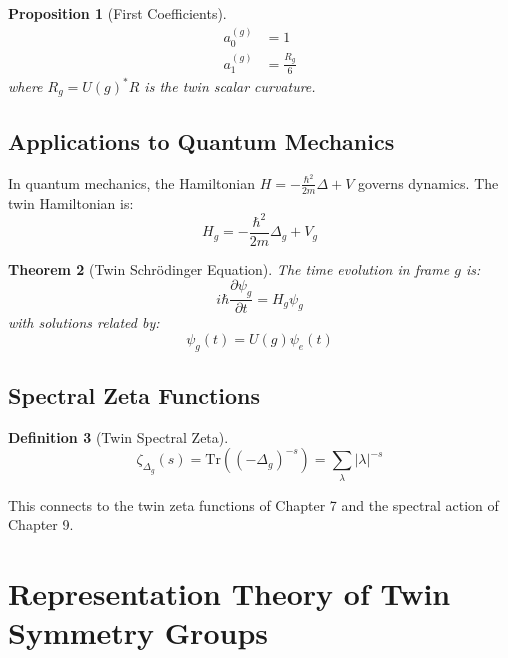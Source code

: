 \documentclass[11pt,a4paper,openright]{book}
\theoremstyle{plain}
\newtheorem{theorem}{Theorem}[chapter]
\newtheorem{proposition}[theorem]{Proposition}
\theoremstyle{definition}
\newtheorem{definition}[theorem]{Definition}
\newcommand{\Tr}{\mathrm{Tr}}
\begin{document}
\begin{proposition}[First Coefficients]
\begin{align}
a_0^{(g)} &= 1 \\
a_1^{(g)} &= \frac{R_g}{6}
\end{align}
where $R_g = U(g)^* R$ is the twin scalar curvature.
\end{proposition}

\section{Applications to Quantum Mechanics}

In quantum mechanics, the Hamiltonian $H = -\frac{\hbar^2}{2m}\Delta + V$ governs dynamics. The twin Hamiltonian is:
\begin{equation}
H_g = -\frac{\hbar^2}{2m}\Delta_g + V_g
\end{equation}

\begin{theorem}[Twin Schrödinger Equation]
The time evolution in frame $g$ is:
\begin{equation}
i\hbar \frac{\partial \psi_g}{\partial t} = H_g \psi_g
\end{equation}
with solutions related by:
\begin{equation}
\psi_g(t) = U(g) \psi_e(t)
\end{equation}
\end{theorem}

\section{Spectral Zeta Functions}

\begin{definition}[Twin Spectral Zeta]
\begin{equation}
\zeta_{\Delta_g}(s) = \Tr((-\Delta_g)^{-s}) = \sum_\lambda |\lambda|^{-s}
\end{equation}
\end{definition}

This connects to the twin zeta functions of Chapter 7 and the spectral action of Chapter 9.

\chapter{Representation Theory of Twin Symmetry Groups}
\label{ch:representation}
\end{document}
